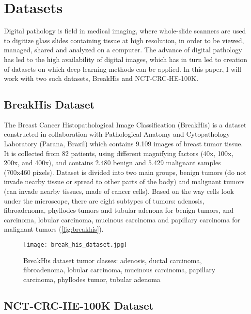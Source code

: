 \section{Datasets}
Digital pathology is field in medical imaging, where whole-slide scanners are used to digitize glass slides containing tissue at high resolution, in order to be viewed, managed, shared and analyzed on a computer. The advance of digital pathology has led to the high availability of digital images, which has in turn led to creation of datasets on which deep learning methods can be applied. In this paper, I will work with two such datasets, BreakHis and NCT-CRC-HE-100K.

\subsection{BreakHis Dataset}

The Breast Cancer Histopathological Image Classification \cite{breakhis_article} (BreakHis) is a dataset constructed in collaboration with Pathological Anatomy and Cytopathology Laboratory (Parana, Brazil) which contains 9.109 images of breast tumor tissue. It is collected from 82 patients, using different magnifying factors (40x, 100x, 200x, and 400x), and contains 2.480  benign and 5.429 malignant samples (700x460 pixels). Dataset is divided into two main groups, benign tumors (do not invade nearby tissue or spread to other parts of the body) and malignant tumors (can invade nearby tissues, made of cancer cells). Based on the way cells look under the microscope, there are eight subtypes of tumors: adenosis, fibroadenoma, phyllodes tumors and tubular adenona for benign tumors, and carcinoma, lobular carcinoma, mucinous carcinoma and papillary carcinoma for malignant tumors (\textcolor{red}{\autoref{fig:breakhis}}).

\captionsetup[figure]{font=scriptsize,labelfont=scriptsize}

\begin{figure}[h]
	\centering
	\texttt{[image: break\_his\_dataset.jpg]}
	\caption{BreakHis dataset tumor classes: adenosis, ductal carcinoma, fibroadenoma, lobular carcinoma, mucinous carcinoma, papillary carcinoma, phyllodes tumor, tubular adenoma}
	\label{fig:breakhis}
\end{figure}

\subsection{NCT-CRC-HE-100K Dataset}

